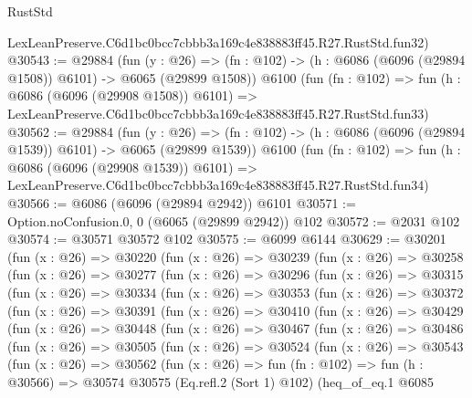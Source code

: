 \begin{lexlean}{RustStd}
\begin{coremodule}
    LexLeanPreserve.C6d1bc0bcc7cbbb3a169c4e838883ff45.R27.RustStd.fun32)
@30543 := @29884
    (fun (y : @26) =>
    (fn : @102) -> (h : @6086 (@6096 (@29894 @1508)) @6101) -> @6065 (@29899 @1508))
    @6100
    (fun (fn : @102) =>
    fun (h : @6086 (@6096 (@29908 @1508)) @6101) =>
    LexLeanPreserve.C6d1bc0bcc7cbbb3a169c4e838883ff45.R27.RustStd.fun33)
@30562 := @29884
    (fun (y : @26) =>
    (fn : @102) -> (h : @6086 (@6096 (@29894 @1539)) @6101) -> @6065 (@29899 @1539))
    @6100
    (fun (fn : @102) =>
    fun (h : @6086 (@6096 (@29908 @1539)) @6101) =>
    LexLeanPreserve.C6d1bc0bcc7cbbb3a169c4e838883ff45.R27.RustStd.fun34)
@30566 := @6086 (@6096 (@29894 @2942)) @6101
@30571 := Option.noConfusion.{0, 0} (@6065 (@29899 @2942)) @102
@30572 := @2031 @102
@30574 := @30571 @30572 @102
@30575 := @6099 @6144
@30629 := @30201
    (fun (x : @26) =>
    @30220
      (fun (x : @26) =>
      @30239
        (fun (x : @26) =>
        @30258
          (fun (x : @26) =>
          @30277
            (fun (x : @26) =>
            @30296
              (fun (x : @26) =>
              @30315
                (fun (x : @26) =>
                @30334
                  (fun (x : @26) =>
                  @30353
                    (fun (x : @26) =>
                    @30372
                      (fun (x : @26) =>
                      @30391
                        (fun (x : @26) =>
                        @30410
                          (fun (x : @26) =>
                          @30429
                            (fun (x : @26) =>
                            @30448
                              (fun (x : @26) =>
                              @30467
                                (fun (x : @26) =>
                                @30486
                                  (fun (x : @26) =>
                                  @30505
                                    (fun (x : @26) =>
                                    @30524
                                      (fun (x : @26) =>
                                      @30543
                                        (fun (x : @26) =>
                                        @30562
                                          (fun (x : @26) =>
                                          fun (fn : @102) =>
                                          fun (h : @30566) =>
                                          @30574
                                            @30575
                                            (Eq.refl.{2} (Sort 1) @102)
                                            (heq_of_eq.{1}
                                              @6085

\end{coremodule}
\end{lexlean}
